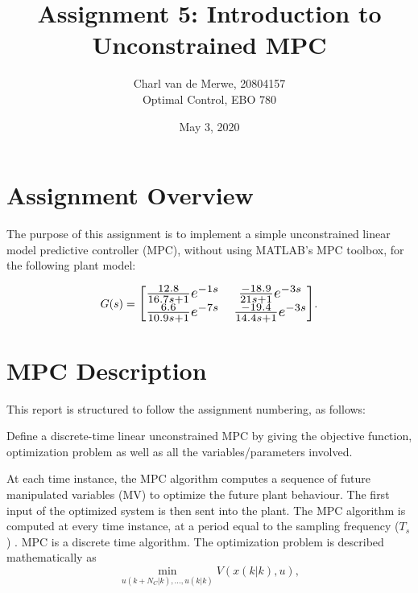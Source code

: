 \documentclass[12pt]{article}
\newenvironment{problem}[2][Problem]{\begin{trivlist}
		\item[\hskip \labelsep {\bfseries #1}\hskip \labelsep {\bfseries #2.}]}{\end{trivlist}}
\begin{document}
\title{Assignment 5: Introduction to Unconstrained MPC}
\author{Charl van de Merwe, 20804157\\
Optimal Control, EBO 780}
\date{May 3, 2020}

\maketitle

\section{Assignment Overview}
The purpose of this assignment is to implement a simple unconstrained linear model predictive controller (MPC), without using MATLAB's MPC toolbox, for the following plant model:

\renewcommand\arraystretch{1.4}
\begin{equation}
G(s) =
\scalebox{1.3}{$  
\begin{bmatrix}
\frac{12.8}{16.7s+1}e^{-1s} & \frac{-18.9}{21s+1}e^{-3s}\\
\frac{6.6}{10.9s+1}e^{-7s} & \frac{-19.4}{14.4s+1}e^{-3s}
\end{bmatrix}$}. \label{eq1}
\end{equation}
\renewcommand\arraystretch{1}

\section{MPC Description}
\label{code:mpcDesc}

This report is structured to follow the assignment numbering, as follows:
\begin{problem}{1} Define a discrete-time linear unconstrained MPC by giving the objective function, optimization problem as well as all the variables/parameters involved.\end{problem}

At each time instance, the MPC algorithm computes a sequence of future manipulated variables (MV) to optimize the future plant behaviour. The first input of the optimized system is then sent into the plant. The MPC algorithm is computed at every time instance, at a period equal to the sampling frequency ($ T_s $) \cite{Qin.2003}. MPC is a discrete time algorithm. The optimization problem is described mathematically as
\begin{equation}
\min_{u(k+N_C|k),...,u(k|k)} V(x(k|k),u),
\end{equation}
\end{document}
